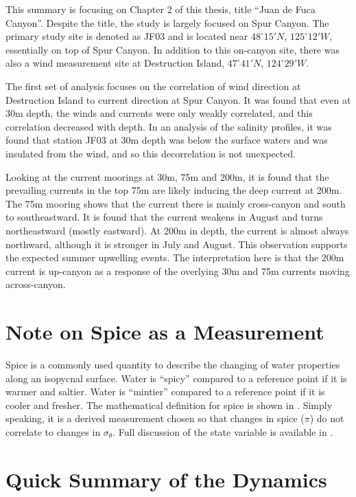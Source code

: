 \documentclass[12pt]{extreport}
\begin{document}
This summary is focusing on Chapter 2 of this thesis, title ``Juan de Fuca Canyon''. Despite the title, the study is largely focused on Spur Canyon. The primary study site is denoted as JF03 and is located near $48^\circ15' N$, $125^\circ 12' W$, essentially on top of Spur Canyon. In addition to this on-canyon site, there was also a wind measurement site at Destruction Island, $47^\circ 41' N$, $124^\circ 29' W$.

The first set of analysis focuses on the correlation of wind direction at Destruction Island to current direction at Spur Canyon. It was found that even at 30m depth, the winds and currents were only weakly correlated, and this correlation decreased with depth. In an analysis of the salinity profiles, it was found that station JF03 at 30m depth was below the surface waters and was insulated from the wind, and so this decorrelation is not unexpected.

Looking at the current moorings at 30m, 75m and 200m, it is found that the prevailing currents in the top 75m are likely inducing the deep current at 200m. The 75m mooring shows that the current there is mainly cross-canyon and south to southeastward. It is found that the current weakens in August and turns northeastward (mostly eastward). At 200m in depth, the current is almost always northward, although it is stronger in July and August. This observation supports the expected summer upwelling events. The interpretation here is that the 200m current is up-canyon as a response of the overlying 30m and 75m currents moving across-canyon.

\section{Note on Spice as a Measurement}

Spice is a commonly used quantity to describe the changing of water properties along an isopycnal surface. Water is ``spicy'' compared to a reference point if it is warmer and saltier. Water is ``mintier'' compared to a reference point if it is cooler and fresher. The mathematical definition for spice is shown in \cite{flament2002state}. Simply speaking, it is a derived measurement chosen so that changes in spice ($\pi$) do not correlate to changes in $\sigma_\theta$. Full discussion of the state variable is available in \cite{flament2002state}.

\newpage
\section{Quick Summary of the Dynamics}
\end{document}
